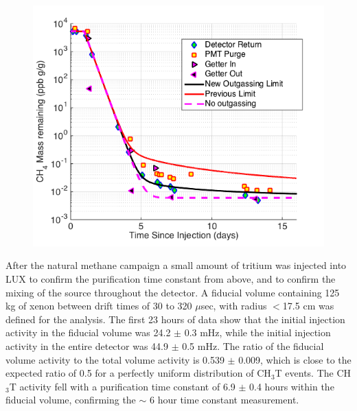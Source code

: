 \begin{figure} [!h]
\includegraphics[scale=.7]{LUXOutgassing.png} 
\label{LuxOutgassing}
\end{figure}

After the natural methane campaign a small amount of tritium was injected into LUX to confirm the purification time constant from above, and to confirm the mixing of the source throughout the detector.  A fiducial volume containing 125 kg of xenon between drift times of 30 to 320 $\mu$sec, with radius $ < $17.5 cm was defined for the analysis.  The first 23 hours of data show that the initial injection activity in the fiducial volume was 24.2 $\pm$ 0.3 mHz, while the initial injection activity in the entire detector was 44.9 $\pm$ 0.5 mHz.  The ratio of the fiducial volume activity to the total volume activity is 0.539 $\pm$ 0.009, which is close to the expected ratio of 0.5 for a perfectly uniform distribution of CH$_3$T events. The CH$_3$T activity fell with a purification time constant of 6.9 $\pm$ 0.4 hours within the fiducial volume, confirming the $\sim$ 6 hour time constant measurement.

